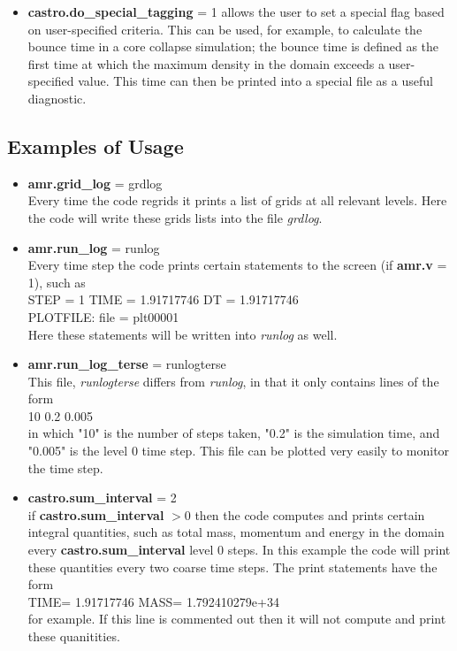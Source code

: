 \begin{itemize}

\item {\bf castro.do\_special\_tagging} = 1 allows the user to set a special flag based on
user-specified criteria.  This can be used, for example, to calculate the bounce time in a 
core collapse simulation; the bounce time is defined as the first time at which the maximum
density in the domain exceeds a user-specified value.   This time can then be printed into
a special file as a useful diagnostic.

\end{itemize}

\subsection{Examples of Usage}

\begin{itemize}

\item {\bf amr.grid\_log} = grdlog \\
Every time the code regrids it prints a list of grids at all relevant levels.  
Here the code will write these grids lists into the file {\em grdlog}.

\item {\bf amr.run\_log} = runlog \\ 
Every time step the code prints certain statements to the screen (if {\bf amr.v} = 1), such as \\
STEP = 1 TIME = 1.91717746 DT = 1.91717746 \\
PLOTFILE: file = plt00001 \\
Here these statements will be written into {\em runlog} as well.

\item {\bf amr.run\_log\_terse} = runlogterse \\ 
This file, {\em runlogterse} differs from {\em runlog}, in that it only contains lines
of the form \\ 
10  0.2  0.005 \\
in which "10" is the number of steps taken, "0.2" is the simulation time, and "0.005" is the 
level 0 time step.  This file can be plotted very easily to monitor the time step.

\item {\bf castro.sum\_interval} = 2 \\
if {\bf castro.sum\_interval} $> 0$ then the code computes and prints certain integral quantities, 
such as total mass, momentum and energy in the domain every {\bf castro.sum\_interval} level 0 steps. 
In this example the code will print these quantities every two coarse time steps.  The print 
statements have the form \\
TIME= 1.91717746 MASS= 1.792410279e+34 \\
for example. 
If this line is commented out then it will not compute and print these quanitities.

\end{itemize}

